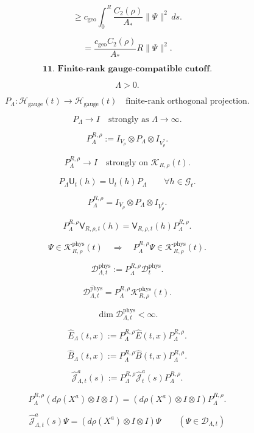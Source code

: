 \documentclass[11pt]{article}
\begin{document}
\[
\ge
c_{\mathrm{geo}}
\int_0^R
\frac{C_2(\rho)}{A_\ast}\|\Psi\|^2\,ds.
\]

\[
=
\frac{c_{\mathrm{geo}}C_2(\rho)}{A_\ast}R\|\Psi\|^2.
\]

\bigskip

\[
\textbf{11. Finite-rank gauge-compatible cutoff.}
\]

\[
\Lambda>0.
\]

\[
P_\Lambda:
\mathcal H_{\mathrm{gauge}}(t)\to\mathcal H_{\mathrm{gauge}}(t)
\quad
\text{finite-rank orthogonal projection}.
\]

\[
P_\Lambda\to I
\quad
\text{strongly as }\Lambda\to\infty.
\]

\[
P_\Lambda^{R,\rho}
:=
I_{V_\rho}\otimes P_\Lambda\otimes I_{V_\rho^\ast}.
\]

\[
P_\Lambda^{R,\rho}\to I
\quad
\text{strongly on }\mathcal K_{R,\rho}(t).
\]

\[
P_\Lambda\mathsf U_t(h)=\mathsf U_t(h)P_\Lambda
\qquad
\forall h\in\mathcal G_t.
\]

\[
P_\Lambda^{R,\rho}
=
I_{V_\rho}\otimes P_\Lambda\otimes I_{V_\rho^\ast}.
\]

\[
P_\Lambda^{R,\rho}\mathsf V_{R,\rho,t}(h)
=
\mathsf V_{R,\rho,t}(h)P_\Lambda^{R,\rho}.
\]

\[
\Psi\in\mathcal K_{R,\rho}^{\mathrm{phys}}(t)
\quad\Longrightarrow\quad
P_\Lambda^{R,\rho}\Psi\in \mathcal K_{R,\rho}^{\mathrm{phys}}(t).
\]

\[
\mathscr D_{\Lambda,t}^{\mathrm{phys}}
:=
P_\Lambda^{R,\rho}\mathscr D_t^{\mathrm{phys}}.
\]

\[
\overline{\mathscr D_{\Lambda,t}^{\mathrm{phys}}}
=
P_\Lambda^{R,\rho}\mathcal K_{R,\rho}^{\mathrm{phys}}(t).
\]

\[
\dim\mathscr D_{\Lambda,t}^{\mathrm{phys}}<\infty.
\]

\[
\widehat E_\Lambda(t,x)
:=
P_\Lambda^{R,\rho}\widehat E(t,x)P_\Lambda^{R,\rho}.
\]

\[
\widehat B_\Lambda(t,x)
:=
P_\Lambda^{R,\rho}\widehat B(t,x)P_\Lambda^{R,\rho}.
\]

\[
\widehat{\mathcal J}_{\Lambda,t}^a(s)
:=
P_\Lambda^{R,\rho}\widehat{\mathcal J}_{t}^a(s)P_\Lambda^{R,\rho}.
\]

\[
P_\Lambda^{R,\rho}
(d\rho(X^a)\otimes I\otimes I)
=
(d\rho(X^a)\otimes I\otimes I)
P_\Lambda^{R,\rho}.
\]

\[
\widehat{\mathcal J}_{\Lambda,t}^a(s)\Psi
=
(d\rho(X^a)\otimes I\otimes I)\Psi
\qquad
(\Psi\in\mathscr D_{\Lambda,t})
\]
\end{document}
